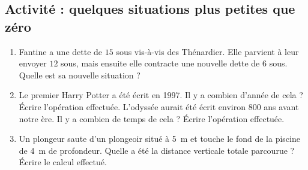 
\subsection*{Activité : quelques situations plus petites que zéro}

\begin{enumerate}
    \item
        Fantine a une dette de \( 15\) sous vis-à-vis des Thénardier. Elle parvient à leur envoyer \( 12\) sous, mais ensuite elle contracte une nouvelle dette de \( 6\) sous. Quelle est sa nouvelle situation ?
    \item
        Le premier Harry Potter a été écrit en 1997. Il y a combien d'année de cela ? Écrire l'opération effectuée. L'odyssée aurait été écrit environ \( 800\) ans avant notre ère. Il y a combien de temps de cela ? Écrire l'opération effectuée.
    \item
        Un plongeur saute d'un plongeoir situé à \SI{5}{\meter} et touche le fond de la piscine de \SI{4}{\meter} de profondeur. Quelle a été la distance verticale totale parcourue ? Écrire le calcul effectué.

\end{enumerate}

